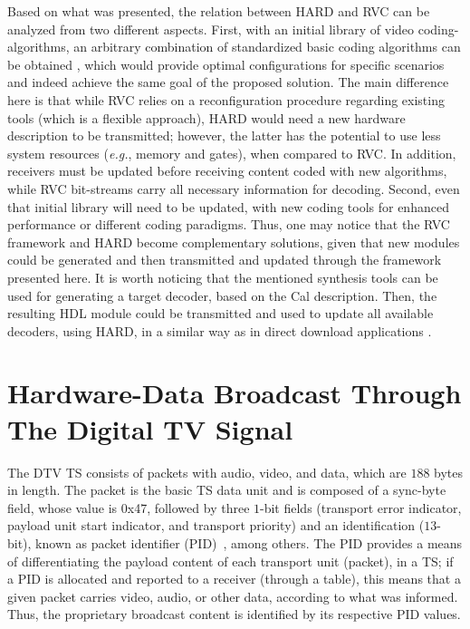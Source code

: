 Based on what was presented, the relation between HARD and RVC can be analyzed from two different aspects. First, with an initial library of video coding-algorithms, an arbitrary combination of standardized basic coding algorithms can be obtained \cite{ref34}, which would provide optimal configurations for specific scenarios and indeed achieve the same goal of the proposed solution. The main difference here is that while RVC relies on a reconfiguration procedure regarding existing tools (which is a flexible approach), HARD would need a new hardware description to be transmitted; however, the latter has the potential to use less system resources ({\it e.g.}, memory and gates), when compared to RVC. In addition, receivers must be updated before receiving content coded with new algorithms, while RVC bit-streams carry all necessary information for decoding. Second, even that initial library will need to be updated, with new coding tools for enhanced performance or different coding paradigms. Thus, one may notice that the RVC framework and HARD become complementary solutions, given that new modules could be generated and then transmitted and updated through the framework presented here. It is worth noticing that the mentioned synthesis tools \cite{ref35} can be used for generating a target decoder, based on the Cal description. Then, the resulting HDL module could be transmitted and used to update all available decoders, using HARD, in a similar way as in direct download applications \cite{ref34}.

\section{Hardware-Data Broadcast Through The Digital TV Signal}
\label{hardware-data}

The DTV TS consists of packets with audio, video, and data, which are $188$ bytes in length. The packet is the basic TS data unit and is composed of a sync-byte field, whose value is 0x47, followed by three $1$-bit fields (transport error indicator, payload unit start indicator, and transport priority) and an identification ($13$-bit), known as packet identifier (PID)~\cite{ref17}, among others. The PID provides a means of differentiating the payload content of each transport unit (packet), in a TS; if a PID is allocated and reported to a receiver (through a table), this means that a given packet carries video, audio, or other data, according to what was informed. Thus, the proprietary broadcast content is identified by its respective PID values.

